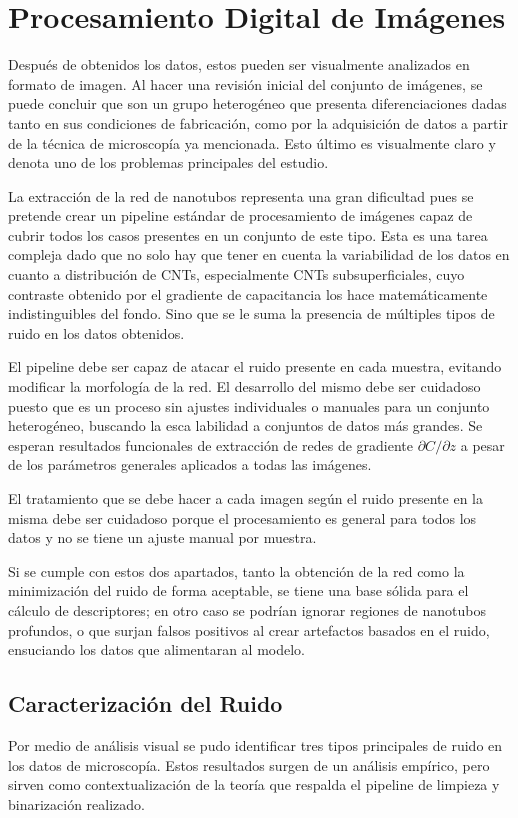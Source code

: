 \section{Procesamiento Digital de Imágenes}
Después de obtenidos los datos, estos pueden ser visualmente analizados en formato de imagen.  Al hacer una revisión inicial del conjunto de imágenes, se puede concluir que son un grupo heterogéneo que presenta diferenciaciones dadas tanto en sus condiciones de fabricación, como por la adquisición de datos a partir de la técnica de microscopía ya mencionada. Esto último es visualmente claro y denota uno de los problemas principales del estudio. 

La extracción de la red de nanotubos representa una gran dificultad pues se pretende crear un pipeline estándar de procesamiento de imágenes capaz de cubrir todos los casos presentes en un conjunto de este tipo. Esta es una tarea compleja dado que no solo hay que tener en cuenta la variabilidad de los datos en cuanto a distribución de CNTs, especialmente CNTs subsuperficiales, cuyo contraste obtenido por el gradiente de capacitancia los hace matemáticamente indistinguibles del fondo. Sino que se le suma la presencia de múltiples tipos de ruido en los datos obtenidos.

El pipeline debe ser capaz de atacar el ruido presente en cada muestra, evitando modificar la morfología de la red. El desarrollo del mismo debe ser cuidadoso puesto que es un proceso sin ajustes individuales o manuales para un conjunto heterogéneo, buscando la esca labilidad a conjuntos de datos más grandes. Se esperan resultados funcionales de extracción de redes de gradiente $\partial C/\partial z$ a pesar de los parámetros generales aplicados a todas las imágenes. 

El tratamiento que se debe hacer a cada imagen según el ruido presente en la misma debe ser cuidadoso porque el procesamiento es general para todos los datos y no se tiene un ajuste manual por muestra.

Si se cumple con estos dos apartados, tanto la obtención de la red como la minimización del ruido de forma aceptable, se tiene una base sólida para el cálculo de descriptores; en otro caso se podrían ignorar regiones de nanotubos profundos, o que surjan falsos positivos al crear artefactos basados en el ruido, ensuciando los datos que alimentaran al modelo.

\subsection{Caracterización del Ruido}
Por medio de análisis visual se pudo identificar tres tipos principales de ruido en los datos de microscopía. Estos resultados surgen de un análisis empírico, pero sirven como contextualización de la teoría que respalda el pipeline de limpieza y binarización realizado.


